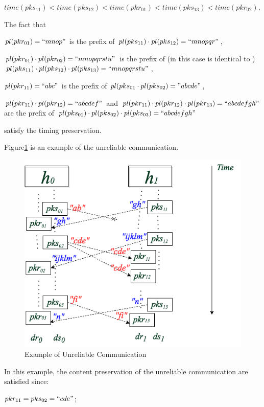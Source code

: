 $time(pks_{11}) < time(pks_{12}) < time(pkr_{01})< time(pks_{13}) < time(pkr_{02})$. 

The fact that
 
$pl(pkr_{01}) = ``mnop"$ is the prefix of $pl(pks_{11}) \cdot  pl(pks_{12}) = ``mnopqr"$,

$pl(pkr_{01}) \cdot pl(pkr_{02})=``mnopqrstu"$ is the prefix of (in this case is identical to ) $pl(pks_{11}) \cdot pl(pks_{12}) \cdot pl(pks_{13}) = ``mnopqrstu" $,  

$pl(pkr_{11})=``abc"$ is the prefix of $pl(pks_{01} \cdot pl(pks_{02}) = "abcde"$,  

$pl(pkr_{11}) \cdot pl(pkr_{12})= ``abcdef"$ and  $pl(pkr_{11}) \cdot pl(pkr_{12}) \cdot pl(pkr_{13}) = ``abcdefgh"$ are  the prefix of  $pl(pks_{01}) \cdot pl(pks_{02}) \cdot pl(pks_{03})= ``abcdefgh"$

satisfy the timing preservation. 


Figure\ref{unreliableexample} is an example of the unreliable communication. 

\begin{figure}[H]
\centerline{\includegraphics[scale=0.5]{Figures/unreliableexample}}
\caption{Example of Unreliable Communication}
\label{unreliableexample}
\end{figure}

In this example, the content preservation of the unreliable communication are satisfied since: 

$pkr_{11} = pks_{02}=``cde"$; 

